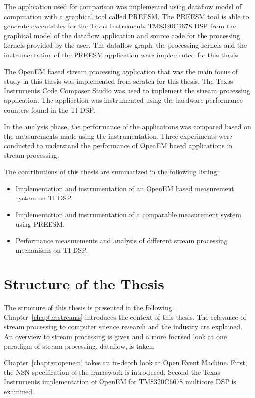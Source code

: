 The application used for comparison was implemented using dataflow model of computation with a graphical tool called PREESM. The PREESM tool is able to generate executables for the Texas Instruments TMS320C6678 DSP from the graphical model of the dataflow application and source code for the processing kernels provided by the user. The dataflow graph, the processing kernels and the instrumentation of the PREESM application were implemented for this thesis.

The OpenEM based stream processing application that was the main focus of study in this thesis was implemented from scratch for this thesis. The Texas Instruments Code Composer Studio was used to implement the stream processing application. The application was instrumented using the hardware performance counters found in the TI DSP.

In the analysis phase, the performance of the applications was compared based on the measurements made using the instrumentation. Three experiments were conducted to understand the performance of OpenEM based applications in stream processing.

The contributions of this thesis are summarized in the following listing:
\begin{itemize}
    \item Implementation and instrumentation of an OpenEM based measurement system on TI DSP.
    \item Implementation and instrumentation of a comparable measurement system using PREESM.
    \item Performance measurements and analysis of different stream processing mechanisms on TI DSP.
\end{itemize}

\section{Structure of the Thesis}
\label{section:structure}
The structure of this thesis is presented in the following. Chapter~\ref{chapter:streams} introduces the context of this thesis. The relevance of stream processing to computer science research and the industry are explained. An overview to stream processing is given and a more focused look at one paradigm of stream processing, dataflow, is taken.

Chapter~\ref{chapter:openem} takes an in-depth look at Open Event Machine. First, the NSN specification of the framework is introduced. Second the Texas Instruments implementation of OpenEM for TMS320C6678 multicore DSP is examined.

